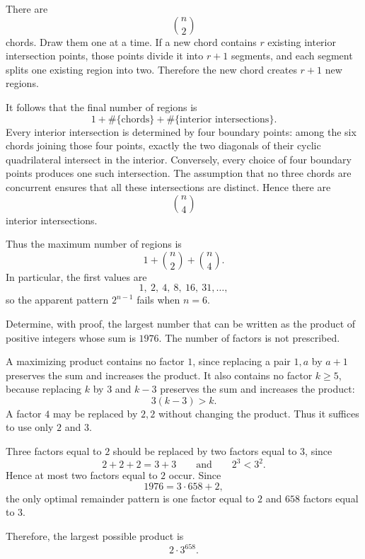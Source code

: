     \begin{solution}
        There are
        \[
            \binom{n}{2}
        \]
        chords. Draw them one at a time. If a new chord contains $r$ existing
        interior intersection points, those points divide it into $r+1$
        segments, and each segment splits one existing region into two.
        Therefore the new chord creates $r+1$ new regions.

        It follows that the final number of regions is
        \[
            1
            +
            \#\{\text{chords}\}
            +
            \#\{\text{interior intersections}\}.
        \]
        Every interior intersection is determined by four boundary points:
        among the six chords joining those four points, exactly the two
        diagonals of their cyclic quadrilateral intersect in the interior.
        Conversely, every choice of four boundary points produces one such
        intersection. The assumption that no three chords are concurrent
        ensures that all these intersections are distinct. Hence there are
        \[
            \binom{n}{4}
        \]
        interior intersections.

        Thus the maximum number of regions is
        \[
            \boxed{
                1+\binom{n}{2}+\binom{n}{4}
            }.
        \]
        In particular, the first values are
        \[
            1,\ 2,\ 4,\ 8,\ 16,\ 31,\ldots,
        \]
        so the apparent pattern $2^{n-1}$ fails when $n=6$.
    \end{solution}

    \begin{expectedproblem}[1976 IMO]
        Determine, with proof, the largest number that can be written as the
        product of positive integers whose sum is $1976$. The number of
        factors is not prescribed.
    \end{expectedproblem}

    \begin{solution}
        A maximizing product contains no factor $1$, since replacing a pair
        $1,a$ by $a+1$ preserves the sum and increases the product. It also
        contains no factor $k\geq5$, because replacing $k$ by $3$ and $k-3$
        preserves the sum and increases the product:
        \[
            3(k-3)>k.
        \]
        A factor $4$ may be replaced by $2,2$ without changing the product.
        Thus it suffices to use only $2$ and $3$.

        Three factors equal to $2$ should be replaced by two factors equal to
        $3$, since
        \[
            2+2+2=3+3
            \qquad\text{and}\qquad
            2^3<3^2.
        \]
        Hence at most two factors equal to $2$ occur. Since
        \[
            1976=3\cdot658+2,
        \]
        the only optimal remainder pattern is one factor equal to $2$ and
        $658$ factors equal to $3$.

        Therefore, the largest possible product is
        \[
            \boxed{2\cdot3^{658}}.
        \]
    \end{solution}

